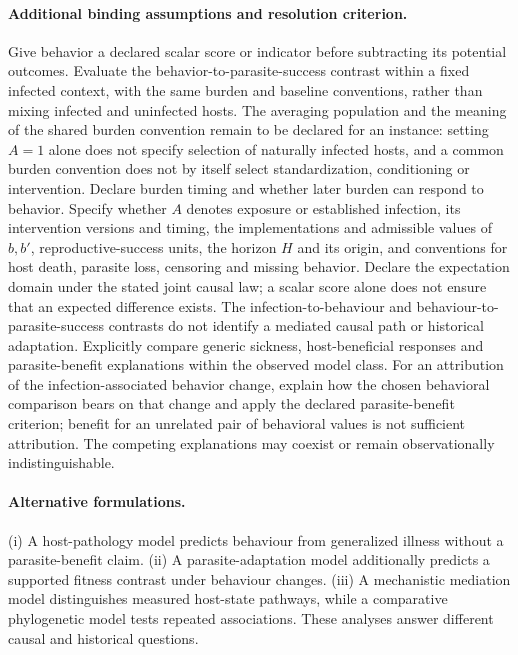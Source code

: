 \documentclass[11pt]{article}
\begin{document}
\paragraph{Additional binding assumptions and resolution criterion.} Give behavior a declared scalar score or indicator before subtracting its potential outcomes. Evaluate the behavior-to-parasite-success contrast within a fixed infected context, with the same burden and baseline conventions, rather than mixing infected and uninfected hosts. The averaging population and the meaning of the shared burden convention remain to be declared for an instance: setting $A=1$ alone does not specify selection of naturally infected hosts, and a common burden convention does not by itself select standardization, conditioning or intervention. Declare burden timing and whether later burden can respond to behavior. Specify whether $A$ denotes exposure or established infection, its intervention versions and timing, the implementations and admissible values of $b,b'$, reproductive-success units, the horizon $H$ and its origin, and conventions for host death, parasite loss, censoring and missing behavior. Declare the expectation domain under the stated joint causal law; a scalar score alone does not ensure that an expected difference exists. The infection-to-behaviour and behaviour-to-parasite-success contrasts do not identify a mediated causal path or historical adaptation. Explicitly compare generic sickness, host-beneficial responses and parasite-benefit explanations within the observed model class. For an attribution of the infection-associated behavior change, explain how the chosen behavioral comparison bears on that change and apply the declared parasite-benefit criterion; benefit for an unrelated pair of behavioral values is not sufficient attribution. The competing explanations may coexist or remain observationally indistinguishable.

\paragraph{Alternative formulations.} (i) A host-pathology model predicts behaviour from generalized illness without a parasite-benefit claim. (ii) A parasite-adaptation model additionally predicts a supported fitness contrast under behaviour changes. (iii) A mechanistic mediation model distinguishes measured host-state pathways, while a comparative phylogenetic model tests repeated associations. These analyses answer different causal and historical questions.
\end{document}
